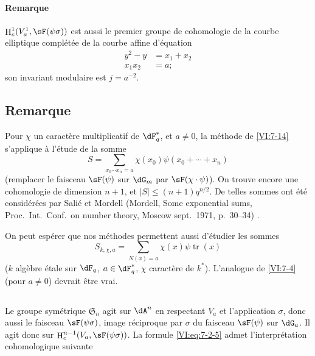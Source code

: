 \documentclass[oneside]{book}
\DeclareMathOperator{\h}{H}
\DeclareMathOperator{\tr}{tr}
\theoremstyle{sga-source}
\theoremstyle{sga-source-dash}
\theoremstyle{sga-source-dotdash}
\theoremstyle{sga-source-number-note-dash}
\theoremstyle{sga-source-note-number-dotdash}
\theoremstyle{sga-source-example-dotdash}
\theoremstyle{sga-source-inline-number}
\theoremstyle{sga-source-bare-number}
\theoremstyle{sga-source}
\newcommand{\PrintPage}[1]{}\newcommand{\MathPage}[1]{}\newcommand{\PrintCite}[2]{#1}\newcommand{\var}[3]{#2}
\begin{document}
\paragraph{Remarque}

$\h_c^1(V_a^1,\sF(\psi\sigma))$ est aussi le premier groupe de cohomologie de 
la courbe elliptique complétée de la courbe affine d'équation 
\begin{align*}
  y^2-y &= x_1+x_2 \\
  x_1 x_2 &= a \text{;} 
\end{align*}
son invariant modulaire est $j=a^{-2}$. 





\PrintPage{228}
\subsection{Remarque}\label{VI:7-18}

Pour $\chi$ un caractère multiplicatif de $\dF_q^\ast$, et $a\ne 0$, la 
méthode de \ref{VI:7-14} s'applique à l'étude de la somme 
\[
  S = \sum_{x_0\dotsm x_n = a} \chi(x_0) \psi(x_0+\cdots + x_n) 
\]
(remplacer le faisceau $\sF(\psi)$ sur $\dG_m$ par $\sF(\chi\cdot \psi)$). On 
trouve encore une cohomologie de dimension $n+1$, et 
$|S|\leqslant (n+1)q^{n/2}$. De telles sommes ont été considérées par 
Salié et Mordell (Mordell, Some exponential sums, Proc.~Int.~Conf.~on number theory, Moscow sept.~1971, p.~30--34) \cite{mo73}.

On peut espérer que nos méthodes permettent aussi d'étudier les sommes 
\[
  S_{k,\chi,a} = \sum_{N(x)=a} \chi(x) \psi \tr(x) 
\]
($k$ algèbre étale sur $\dF_q$, $a\in \dF_q^\ast$, $\chi$ caractère de 
$k^\ast$). L'analogue de \ref{VI:7-4} (pour $a\ne 0$) devrait être vrai. 





\subsection{}\label{VI:7-19}

\var{Le groupe symétrique $\mathfrak{S}_m$}{Le groupe symétrique $\mathfrak{S}_n$}{S45-SOL-0966} agit sur $\dA^n$ en respectant $V_a$ et 
l'application $\sigma$, donc aussi le faisceau $\sF(\psi\sigma)$, image 
réciproque par $\sigma$ du faisceau $\sF(\psi)$ sur $\dG_a$. \var{Il s'agit donc sur}{Il agit donc sur}{S45-SOL-0969} $\h_c^{n-1}(V_a,\sF(\psi\sigma))$. La formule \eqref{VI:eq:7-2-5} admet 
l'interprétation cohomologique suivante
\end{document}
